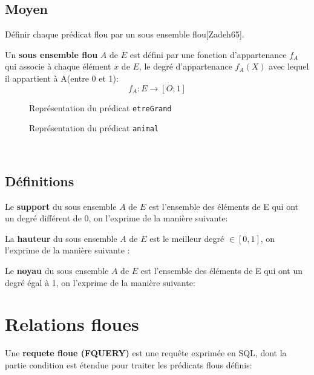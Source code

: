 \documentclass[a4paper,11pt]{article}
\begin{document}
\subsection{Moyen}
Définir chaque prédicat flou par un sous ensemble flou[Zadeh65].

Un \textbf{sous ensemble flou} $A$ de $E$ est défini par une fonction d'appartenance $f_A$ qui associe à chaque élément $x$ de $E$, le degré d'appartenance $f_A(X)$ avec lequel il appartient à A(entre 0 et 1):$$f_A:E\rightarrow[O;1]$$

		\begin{figure}[!h]
			\centering
			
			\caption{Représentation du prédicat \texttt{etreGrand}}
		\end{figure}
		
		\begin{figure}[!h]
			\centering
			
			\caption{Représentation du prédicat \texttt{animal}}
		\end{figure}
		~
		
\subsection{Définitions}

Le \textbf{support} du sous ensemble $A$ de $E$ est l'ensemble des éléments de E qui ont un degré différent de 0, on l'exprime de la manière suivante: \begin{center}  \end{center}

La \textbf{hauteur} du sous ensemble $A$ de $E$ est le meilleur degré $\in [0,1]$, on l'exprime de la manière suivante : \begin{center}  \end{center}

Le \textbf{noyau} du sous ensemble $A$ de $E$ est l'ensemble des éléments de E qui ont un degré égal à 1, on l'exprime de la manière suivante: \begin{center}  \end{center}

\section{Relations floues}
Une \textbf{requete floue (FQUERY)} est une requête exprimée en SQL, dont la partie condition est étendue pour traiter les prédicats flous définis:\\
\end{document}
